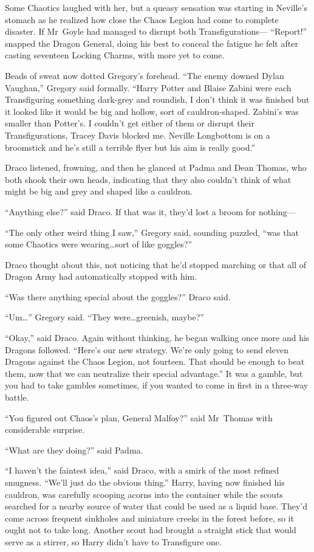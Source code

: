 Some Chaotics laughed with her, but a queasy sensation was starting in
Neville’s stomach as he realized how close the Chaos Legion had come to
complete disaster. If Mr~Goyle had managed to disrupt both Transfigurations—
\later
“Report!” snapped the Dragon General, doing his best to conceal the fatigue he
felt after casting seventeen Locking Charms, with more yet to come.

Beads of sweat now dotted Gregory’s forehead. “The enemy downed Dylan Vaughan,”
Gregory said formally. “Harry Potter and Blaise Zabini were each Transfiguring
something dark-grey and roundish, I don’t think it was finished but it looked
like it would be big and hollow, sort of cauldron-shaped. Zabini’s was smaller
than Potter’s. I couldn’t get either of them or disrupt their Transfigurations,
Tracey Davis blocked me. Neville Longbottom is on a broomstick and he’s still a
terrible flyer but his aim is really good.”

Draco listened, frowning, and then he glanced at Padma and Dean Thomas, who
both shook their own heads, indicating that they also couldn’t think of what
might be big and grey and shaped like a cauldron.

“Anything else?” said Draco. If that was it, they’d lost a broom for nothing—

“The only other weird thing I saw,” Gregory said, sounding puzzled, “was that
some Chaotics were wearing…sort of like goggles?”

Draco thought about this, not noticing that he’d stopped marching or that all
of Dragon Army had automatically stopped with him.

“Was there anything special about the goggles?” Draco said.

“Um…” Gregory said. “They were…greenish, maybe?”

“Okay,” said Draco. Again without thinking, he began walking once more and his
Dragons followed. “Here’s our new strategy. We’re only going to send eleven
Dragons against the Chaos Legion, not fourteen. That should be enough to beat
them, now that we can neutralize their special advantage.” It was a gamble, but
you had to take gambles sometimes, if you wanted to come in first in a
three-way battle.

“You figured out Chaos’s plan, General Malfoy?” said Mr~Thomas with
considerable surprise.

“What are they doing?” said Padma.

“I haven’t the faintest idea,” said Draco, with a smirk of the most refined
smugness. “We’ll just do the obvious thing.”
\later
Harry, having now finished his cauldron, was carefully scooping acorns into the
container while the scouts searched for a nearby source of water that could be
used as a liquid base. They’d come across frequent sinkholes and miniature
creeks in the forest before, so it ought not to take long. Another scout had
brought a straight stick that would serve as a stirrer, so Harry didn’t have to
Transfigure one.

